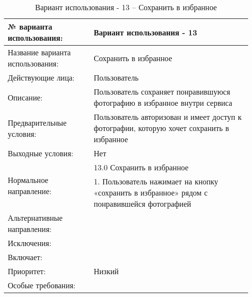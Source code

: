 \begin{table}[H]
  \caption{Вариант использования - 13 – Сохранить в избранное}\label{use-case-13-table}
  \begin{tabular}{|p{6cm}|p{10cm}|}
  \hline № варианта использования: & Вариант использования - 13 \\
  \hline Название варианта использования: & Сохранить в избранное \\
  \hline Действующие лица: & Пользователь \\
  \hline Описание: & Пользователь сохраняет понравившуюся фотографию в избранное внутри сервиса \\
  \hline Предварительные условия: & Пользователь авторизован и имеет доступ к фотографии, которую хочет сохранить в избранное \\
  \hline Выходные условия: & Нет \\
  \hline \multirow{2}{*}{Нормальное направление:} & 13.0 Сохранить в избранное \\
  \cline{2-2} & 1. Пользователь нажимает на кнопку «сохранить в избранное» рядом с понравившейся фотографией \\
  \hline Альтернативные направления: &  \\
  \hline Исключения: &  \\
  \hline Включает: &  \\
  \hline Приоритет: & Низкий \\
  \hline Особые требования: &  \\
  \hline 
  \end{tabular}
\end{table}

